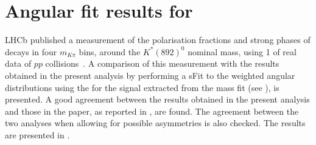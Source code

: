 \section{Angular fit results for \BdJpsiKst}\label{app:BsJpsiKst_angana_BdRes}
LHCb published a measurement of the polarisation fractions and strong phases of \BdJpsiKst decays in four $m_{K\pi}$ bins, around the $K^{*}(892)^{0}$ nominal mass, using 1 \invfb of real data of $pp$ collisions~\cite{LHCb-PAPER-2013-023}. A comparison of this measurement with the results obtained in the present analysis by performing a sFit to the weighted angular distributions using the \sweights for the \Bd signal extracted from the mass fit (see ), is presented. A good agreement between the results obtained in the present analysis and those in the \BdJpsiKst paper, as reported in , are found. The agreement between the two analyses when allowing for possible \CP asymmetries is also checked. The results are presented in . 
%

